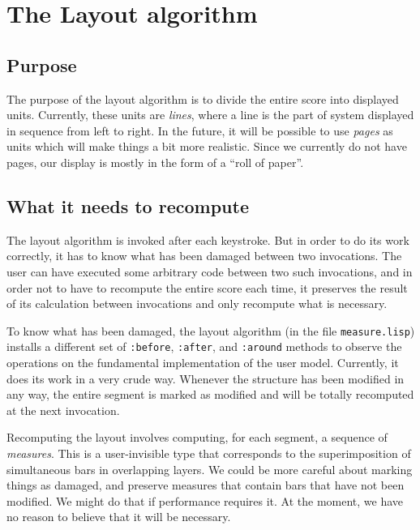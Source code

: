 \documentclass[11pt]{book}
\begin{document}
\chapter{The Layout algorithm}

\section{Purpose}

The purpose of the layout algorithm is to divide the entire score into
displayed units.  Currently, these units are \emph{lines}, where a
line is the part of system displayed in sequence from left to right.
In the future, it will be possible to use \emph{pages} as units which
will make things a bit more realistic.  Since we currently do not have
pages, our display is mostly in the form of a ``roll of paper''.

\section{What it needs to recompute}

The layout algorithm is invoked after each keystroke.  But in order to
do its work correctly, it has to know what has been damaged between
two invocations.  The user can have executed some arbitrary code
between two such invocations, and in order not to have to recompute
the entire score each time, it preserves the result of its calculation
between invocations and only recompute what is necessary. 

To know what has been damaged, the layout algorithm (in the file
\texttt{measure.lisp}) installs a different set of \texttt{:before},
\texttt{:after}, and \texttt{:around} methods to observe the
operations on the fundamental implementation of the user model.
Currently, it does its work in a very crude way.  Whenever the
structure has been modified in any way, the entire segment is marked
as modified and will be totally recomputed at the next invocation. 

Recomputing the layout involves computing, for each segment, a
sequence of \emph{measures}.  This is a user-invisible
type that corresponds to the superimposition of simultaneous bars in
overlapping layers.  We could be more careful about marking things as
damaged, and preserve measures that contain bars that have not been
modified.  We might do that if performance requires it.  At the
moment, we have no reason to believe that it will be necessary.  
\end{document}
